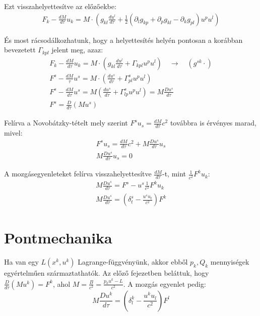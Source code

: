 \documentclass[a4paper,12pt]{article}
\begin{document}
\par Ezt visszahelyettesítve az előzőekbe:
\begin{gather*}
    F_{k} - \frac{dM}{d\tau}u_{k} = M\cdot(g_{kl}\frac{du^{l}}{d\tau} + \frac{1}{2}(\partial_{l}g_{kp} + \partial_{p}g_{kl} - \partial_{k}g_{pl})u^{p}u^{l})
\end{gather*}
\par És most rácsodálkozhatunk, hogy a helyettesítés helyén pontosan a korábban bevezetett $\Gamma_{kpl}$ jelent meg, azaz:
\begin{gather*}
    F_{k} - \frac{dM}{d\tau}u_{k} = M\cdot(g_{kl}\frac{du^{l}}{d\tau} + \Gamma_{kpl}u^{p}u^{l}) \quad \rightarrow \quad (g^{sk}\cdot) \\
    F^{s} - \frac{dM}{\tau}u^{s} = M\cdot(\frac{du^{s}}{d\tau} + \Gamma_{pl}^{s}u^{p}u^{l}) \\
    F^{s} - \frac{dM}{d\tau}u^{s} = M(\frac{du^{s}}{d\tau} + \Gamma_{lp}^{s}u^{p}u^{l}) = M\frac{Du^{s}}{d\tau} \\
    F^{s} = \frac{D}{d\tau}(Mu^{s})
\end{gather*}
\par Felírva a Novobátzky-tételt mely szerint $F^{s}u_{s} = \frac{dM}{d\tau}c^{2}$ továbbra is érvényes marad, mivel:
\begin{gather*}
    F^{s}u_{s} = \frac{dM}{d\tau}c^{2} + M\frac{Du^{s}}{d\tau}u_{s} \\
    M\frac{Du^{s}}{d\tau}u_{s} = 0
\end{gather*}
\par A mozgásegyenleteket felírva visszahelyettesítve $\frac{dM}{d\tau}$-t, mint $\frac{1}{c^{2}}F^{k}u_{k}$:
\begin{gather*}
    M\frac{Du^{s}}{d\tau} = F^{s} - u^{s}\frac{1}{c^{2}}F^{k}u_{k} \\
    M\frac{Du^{s}}{d\tau} = (\delta^{s}_{t} - \frac{u^{s}u_{t}}{c^{2}})F^{k}
\end{gather*}
\section{ Pontmechanika}
\par Ha van egy $L(x^{k}, u^{k})$ Lagrange-függvényünk, akkor ebből $p_{k}, Q_{k}$ mennyiségek egyértelműen származtathatók. Az előző fejezetben beláttuk, hogy $\frac{D}{d\tau}(Mu^{k}) = F^{k}$, ahol $M = \frac{B}{c^{2}} = \frac{p_{k}u^{k} - L}{c^{2}}$. A mozgás egyenlet pedig:
\begin{equation*}
    M\frac{Du^{k}}{d\tau} = (\delta_{l}^{k} - \frac{u^{k}u_{l}}{c^{2}})F^{l}
\end{equation*}
\end{document}
